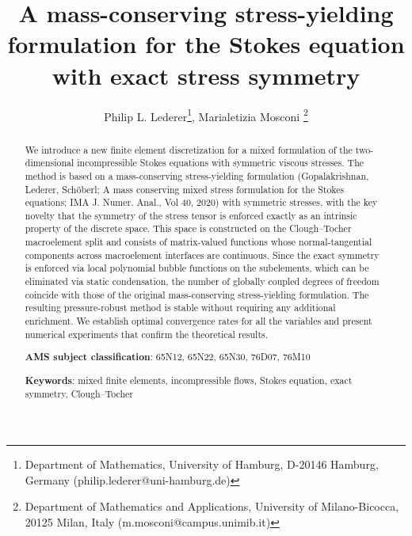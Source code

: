 \documentclass[a4paper,twoside,10pt]{article}
\title{A mass-conserving stress-yielding formulation for the Stokes equation
        with exact stress symmetry}
\author{Philip L. Lederer\thanks{Department of Mathematics, University of Hamburg, D-20146 Hamburg, Germany (philip.lederer@uni-hamburg.de)},
Marialetizia Mosconi \thanks{Department of Mathematics and Applications, University of Milano-Bicocca, 20125 Milan, Italy (m.mosconi@campus.unimib.it)}}
\date{}
\theoremstyle{plain}
\theoremstyle{remark}
\theoremstyle{definition}
\numberwithin{equation}{section}
\numberwithin{figure}{section}
\begin{document}
\maketitle

\begin{abstract}
\noindent
We introduce a new finite element discretization for a mixed formulation of
the two-dimensional incompressible Stokes equations
with symmetric viscous stresses.
The method is based on a mass-conserving stress-yielding formulation (Gopalakrishnan, Lederer, Schöberl; A mass conserving mixed stress formulation for the Stokes equations; IMA J. Numer. Anal., Vol 40, 2020) with symmetric stresses,
with the key novelty that the symmetry of the stress tensor is enforced exactly
as an intrinsic property of the discrete space.
This space is constructed on the Clough--Tocher macroelement split and
consists of matrix-valued functions whose
normal-tangential components across macroelement interfaces are continuous.
Since the exact symmetry is enforced via local polynomial bubble functions
on the subelements,
which can be eliminated via static condensation,
the number of globally coupled degrees of freedom coincide
with those of the original mass-conserving stress-yielding formulation.
The resulting pressure-robust method is stable without requiring any additional enrichment.
We establish optimal convergence rates for all the variables
and present numerical experiments that confirm the theoretical results.


\medskip\noindent
\textbf{AMS subject classification}:
65N12, %
65N22, %
65N30, %
76D07, %
76M10 %

\medskip\noindent
\textbf{Keywords}: mixed finite elements, incompressible flows, Stokes equation, exact symmetry, Clough--Tocher

\end{abstract}


\end{document}
